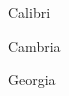 \documentclass[12pt,parskip=half]{scrartcl}
\newenvironment{calibri}{\calibrifont}{\par}
\newenvironment{cambria}{\cambriafont}{\par}
\newenvironment{georgia}{\georgiafont}{\par}
\begin{document}
\begin{calibri}
Calibri \blindtext
\end{calibri}
\begin{cambria}
Cambria \blindtext
\end{cambria}
\begin{georgia}
Georgia \blindtext
\end{georgia}
\end{document}
